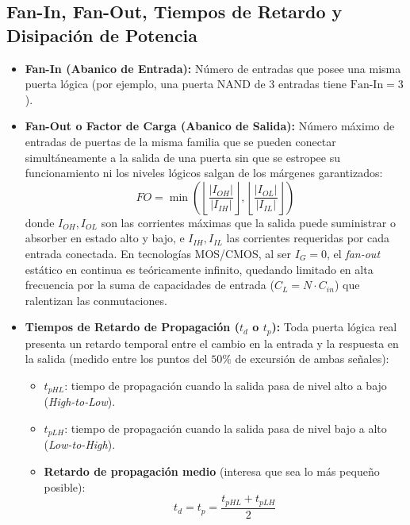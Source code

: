 \subsection{Fan-In, Fan-Out, Tiempos de Retardo y Disipación de Potencia}
\begin{itemize}[leftmargin=*]
    \item \textbf{Fan-In (Abanico de Entrada):} Número de entradas que posee una misma puerta lógica (por ejemplo, una puerta NAND de 3 entradas tiene $\text{Fan-In} = 3$).
    \item \textbf{Fan-Out o Factor de Carga (Abanico de Salida):} Número máximo de entradas de puertas de la misma familia que se pueden conectar simultáneamente a la salida de una puerta sin que se estropee su funcionamiento ni los niveles lógicos salgan de los márgenes garantizados:
    \begin{equation}
        FO = \min\left( \left\lfloor \frac{|I_{OH}|}{|I_{IH}|} \right\rfloor, \left\lfloor \frac{|I_{OL}|}{|I_{IL}|} \right\rfloor \right)
    \end{equation}
    donde $I_{OH}, I_{OL}$ son las corrientes máximas que la salida puede suministrar o absorber en estado alto y bajo, e $I_{IH}, I_{IL}$ las corrientes requeridas por cada entrada conectada. En tecnologías MOS/CMOS, al ser $I_G = 0$, el \textit{fan-out} estático en continua es teóricamente infinito, quedando limitado en alta frecuencia por la suma de capacidades de entrada ($C_L = N \cdot C_{in}$) que ralentizan las conmutaciones.

    \item \textbf{Tiempos de Retardo de Propagación ($t_d$ o $t_p$):}
    Toda puerta lógica real presenta un retardo temporal entre el cambio en la entrada y la respuesta en la salida (medido entre los puntos del $50\%$ de excursión de ambas señales):
    \begin{itemize}
        \item $t_{pHL}$: tiempo de propagación cuando la salida pasa de nivel alto a bajo (\textit{High-to-Low}).
        \item $t_{pLH}$: tiempo de propagación cuando la salida pasa de nivel bajo a alto (\textit{Low-to-High}).
        \item \textbf{Retardo de propagación medio} (interesa que sea lo más pequeño posible):
        \begin{equation}
            t_d = t_p = \frac{t_{pHL} + t_{pLH}}{2}
        \end{equation}
    \end{itemize}


\end{itemize}
